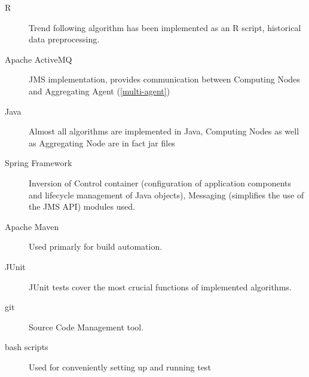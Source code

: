 \begin{description}
  \item [R]
      Trend following algorithm has been implemented as an R script, historical data preprocessing.
  \item [Apache ActiveMQ]
      JMS implementation, provides communication between Computing Nodes and Aggregating Agent (\ref{multi-agent})
  \item [Java]
      Almost all algorithms are implemented in Java, Computing Nodes as well as Aggregating Node are in fact jar files 
  \item [Spring Framework]
      Inversion of Control container (configuration of application components and lifecycle management of Java objects), Messaging (simplifies the use of the JMS API) modules used.
  \item [Apache Maven]
      Used primarly for build automation.
  \item [JUnit]
      JUnit tests cover the most crucial functions of implemented algorithms.
  \item [git]
      Source Code Management tool.
  \item [bash scripts]
      Used for conveniently setting up and running test 
\end{description}

 